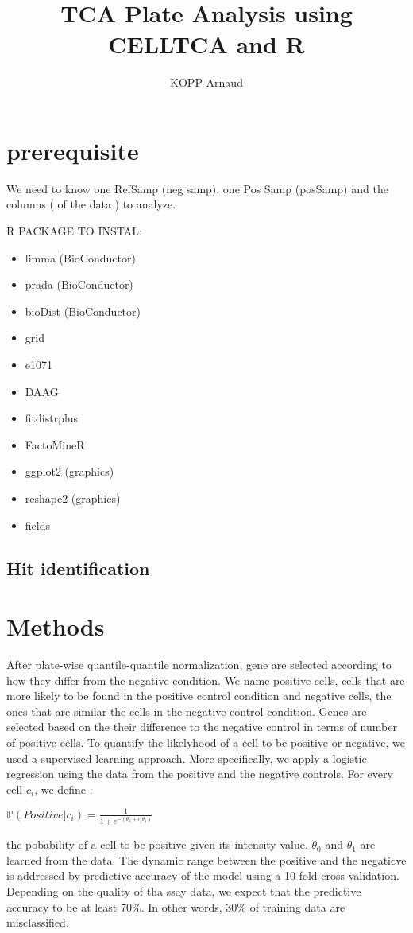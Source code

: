 \documentclass[a4paper,10pt]{article}
\author{KOPP Arnaud}
\title {TCA Plate Analysis using CELLTCA and R}
\begin{document}
\maketitle




\section{prerequisite}
We need to know one RefSamp (neg samp), one Pos Samp (posSamp) and the columns ( of the data ) to analyze.

\bigskip

R PACKAGE TO INSTAL:
\begin{itemize}
  \item limma (BioConductor)
  \item prada (BioConductor)
  \item bioDist (BioConductor)
  \item grid
  \item e1071
  \item DAAG
  \item fitdistrplus
  \item FactoMineR
  \item ggplot2 (graphics)
  \item reshape2 (graphics)
  \item fields
\end{itemize}


\subsection*{Hit identification}


\section{Methods}
After plate-wise quantile-quantile normalization, gene are selected according to how they differ from
the negative condition. We name positive cells, cells that are more likely to be found in the positive 
control condition and negative cells, the ones that are similar the cells in the negative control
condition. Genes are selected based on the their difference to the negative control in terms of
number of positive cells. To quantify the likelyhood of a cell to be positive or negative, we 
used a supervised learning approach. More specifically, we apply a logistic regression using 
the data from the positive and the negative controls. For every cell $c_{i}$, we define :
\begin{center}
  $\mathbb{P}(Positive | c_{i}) = \frac{1}{1+e^{-(\theta_{0}+c_{i}\theta_{1})}}$
\end{center}  
the pobability of a cell to be positive given its intensity value. $\theta_{0}$ and $\theta_{1}$ are 
learned from the data. The dynamic range between the positive and
the negaticve is addressed by predictive accuracy of the model using a 10-fold cross-validation. 
Depending on the quality of tha ssay data, we expect that the predictive accuracy to be at least 70\%.
In other words, 30\% of training data are misclassified.
 
\end{document}
